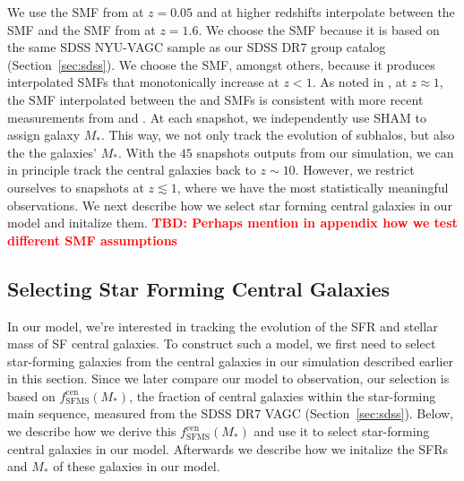 \documentclass[12pt, letterpaper, preprint]{aastex}
\newcommand{\todo}[1]{{\bf \textcolor{red}{#1}}}
\begin{document}
We use the SMF from \cite{li2009} at $z = 0.05$ and at higher redshifts 
interpolate between the \cite{li2009} SMF and the SMF from \cite{marchesini2009} 
at $z = 1.6$. We choose the \cite{li2009} SMF because it is based on the 
same SDSS NYU-VAGC sample as our SDSS DR7 group catalog (Section~\ref{sec:sdss}). 
We choose the \cite{marchesini2009} SMF, amongst others, because it produces 
interpolated SMFs that monotonically increase at $z < 1$. As noted in 
\cite{hahn2017a}, at $z \approx 1$, the SMF interpolated between the 
\cite{li2009} and \cite{marchesini2009} SMFs is consistent with more 
recent measurements from \cite{muzzin2013} and \cite{ilbert2013}. 
At each snapshot, we independently use SHAM to assign galaxy $M_*$. 
This way, we not only track the evolution of subhalos, but also the 
the galaxies' $M_*$. With the $45$ snapshots outputs from our simulation, 
we can in principle track the central galaxies back to $z \sim 10$. 
However, we restrict ourselves to snapshots at $z \lesssim 1$, where we 
have the most statistically meaningful observations. We next describe
how we select star forming central galaxies in our model and initalize them. 
\todo{TBD: Perhaps mention in appendix how we test different SMF assumptions}%


\subsection{Selecting Star Forming Central Galaxies}  \label{sec:sfcen}
In our model, we're interested in tracking the evolution of the
SFR and stellar mass of SF central galaxies. To construct such a model, 
we first need to select star-forming galaxies from the central galaxies 
in our simulation described earlier in this section. Since we later 
compare our model to observation, our selection is based on 
$f^\mathrm{cen}_\mathrm{SFMS}(M_*)$, the fraction of central galaxies 
within the star-forming main sequence, measured from the SDSS DR7 VAGC 
(Section~\ref{sec:sdss}). Below, we describe how we derive this 
$f^\mathrm{cen}_\mathrm{SFMS}(M_*)$ and use it to select star-forming 
central galaxies in our model. Afterwards we describe how we initalize 
the SFRs and $M_*$ of these galaxies in our model.
\end{document}
